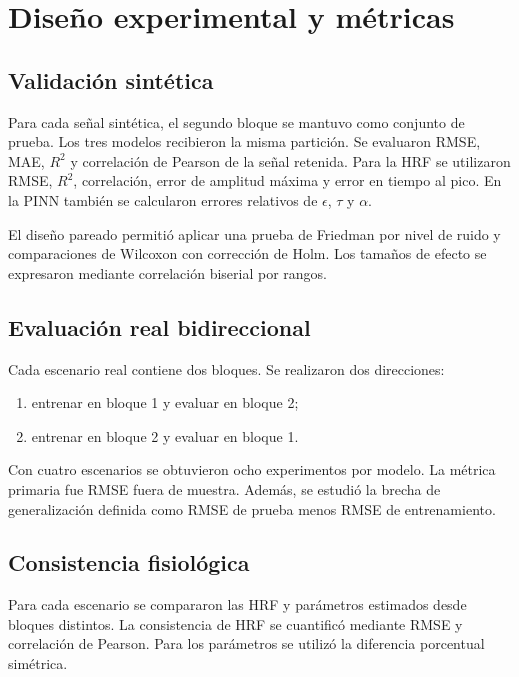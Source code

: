 \section{Diseño experimental y métricas}

\subsection{Validación sintética}

Para cada señal sintética, el segundo bloque se mantuvo como conjunto de prueba. Los tres modelos recibieron la misma partición. Se evaluaron RMSE, MAE, $R^2$ y correlación de Pearson de la señal retenida. Para la HRF se utilizaron RMSE, $R^2$, correlación, error de amplitud máxima y error en tiempo al pico. En la PINN también se calcularon errores relativos de $\epsilon$, $\tau$ y $\alpha$.

El diseño pareado permitió aplicar una prueba de Friedman por nivel de ruido y comparaciones de Wilcoxon con corrección de Holm. Los tamaños de efecto se expresaron mediante correlación biserial por rangos.

\subsection{Evaluación real bidireccional}

Cada escenario real contiene dos bloques. Se realizaron dos direcciones:

\begin{enumerate}
    \item entrenar en bloque 1 y evaluar en bloque 2;
    \item entrenar en bloque 2 y evaluar en bloque 1.
\end{enumerate}

Con cuatro escenarios se obtuvieron ocho experimentos por modelo. La métrica primaria fue RMSE fuera de muestra. Además, se estudió la brecha de generalización definida como RMSE de prueba menos RMSE de entrenamiento.

\subsection{Consistencia fisiológica}

Para cada escenario se compararon las HRF y parámetros estimados desde bloques distintos. La consistencia de HRF se cuantificó mediante RMSE y correlación de Pearson. Para los parámetros se utilizó la diferencia porcentual simétrica.
